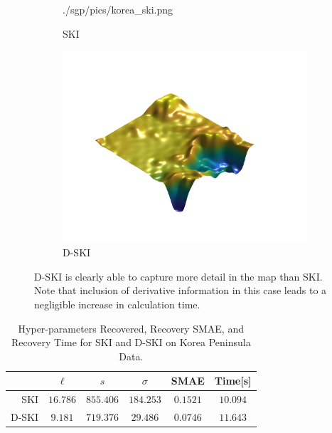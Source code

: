 \begin{figure}[ht]
\begin{center}
\begin{subfigure}{0.30\textwidth}
      {./sgp/pics/korea_ski.png}
      \caption{SKI}\label{fig:korea_ski}
    \end{subfigure}
    \begin{subfigure}{0.30\textwidth}
      \centering
      \captionsetup{justification=centering}
      \includegraphics[width=\textwidth,trim=9cm 6cm 9cm 10cm,clip]
      {./sgp/pics/korea_ski_g.png}
      \caption{D-SKI}\label{fig:korea_ski_g}
    \end{subfigure}
    \caption{D\hyp{}SKI is clearly able to capture more detail in the map than
    SKI.  Note that inclusion of derivative information in this case leads to a
    negligible increase in calculation time.}\label{fig:korea_map}
  \end{center}
\end{figure}

\begin{table}[ht]
  \centering
  \caption{Hyper\hyp{}parameters Recovered, Recovery SMAE, and Recovery Time for
  SKI and D\hyp{}SKI on Korea Peninsula Data.}\label{tab:korea_peninsula}
  \begin{tabular}{r c c c c c}
  \toprule
  & $\ell$ & $s$ & $\sigma$ & SMAE & Time[s]\\ \midrule
  SKI & $16.786$ & $855.406$ & $184.253$ & $0.1521$ & $10.094$\\
  D-SKI & $9.181$ & $719.376$ & $29.486$ & $0.0746$ & $11.643$\\
  \bottomrule
  \end{tabular}
\end{table}


